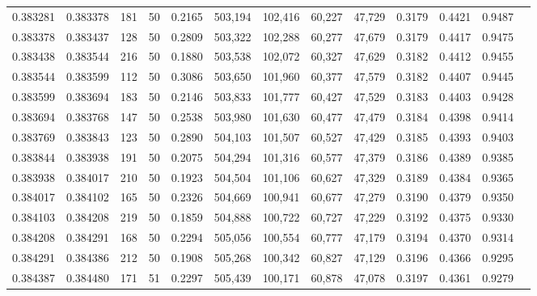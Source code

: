 \begin{tabular}{rrrrrrrrrrrrr}
0.383281 & 0.383378 &   181 &  50 &                                     0.2165 & 503,194 & 102,416 &  60,227 &  47,729 & 0.3179 & 0.4421 & 0.9487 \\
0.383378 & 0.383437 &   128 &  50 &                                     0.2809 & 503,322 & 102,288 &  60,277 &  47,679 & 0.3179 & 0.4417 & 0.9475 \\
0.383438 & 0.383544 &   216 &  50 &                                     0.1880 & 503,538 & 102,072 &  60,327 &  47,629 & 0.3182 & 0.4412 & 0.9455 \\
0.383544 & 0.383599 &   112 &  50 &                                     0.3086 & 503,650 & 101,960 &  60,377 &  47,579 & 0.3182 & 0.4407 & 0.9445 \\
0.383599 & 0.383694 &   183 &  50 &                                     0.2146 & 503,833 & 101,777 &  60,427 &  47,529 & 0.3183 & 0.4403 & 0.9428 \\
0.383694 & 0.383768 &   147 &  50 &                                     0.2538 & 503,980 & 101,630 &  60,477 &  47,479 & 0.3184 & 0.4398 & 0.9414 \\
0.383769 & 0.383843 &   123 &  50 &                                     0.2890 & 504,103 & 101,507 &  60,527 &  47,429 & 0.3185 & 0.4393 & 0.9403 \\
0.383844 & 0.383938 &   191 &  50 &                                     0.2075 & 504,294 & 101,316 &  60,577 &  47,379 & 0.3186 & 0.4389 & 0.9385 \\
0.383938 & 0.384017 &   210 &  50 &                                     0.1923 & 504,504 & 101,106 &  60,627 &  47,329 & 0.3189 & 0.4384 & 0.9365 \\
0.384017 & 0.384102 &   165 &  50 &                                     0.2326 & 504,669 & 100,941 &  60,677 &  47,279 & 0.3190 & 0.4379 & 0.9350 \\
0.384103 & 0.384208 &   219 &  50 &                                     0.1859 & 504,888 & 100,722 &  60,727 &  47,229 & 0.3192 & 0.4375 & 0.9330 \\
0.384208 & 0.384291 &   168 &  50 &                                     0.2294 & 505,056 & 100,554 &  60,777 &  47,179 & 0.3194 & 0.4370 & 0.9314 \\
0.384291 & 0.384386 &   212 &  50 &                                     0.1908 & 505,268 & 100,342 &  60,827 &  47,129 & 0.3196 & 0.4366 & 0.9295 \\
0.384387 & 0.384480 &   171 &  51 &                                     0.2297 & 505,439 & 100,171 &  60,878 &  47,078 & 0.3197 & 0.4361 & 0.9279 \\

\end{tabular}

